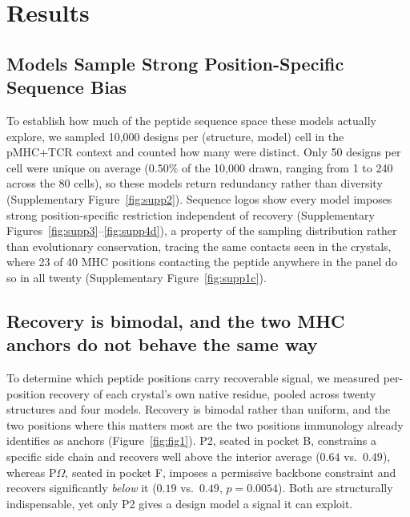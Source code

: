 \documentclass[letterpaper]{article}
\begin{document}
\section{Results}

\subsection{Models Sample Strong Position-Specific Sequence Bias}
\label{sec:sampling}

To establish how much of the peptide sequence space these models actually explore, we sampled 10,000
designs per (structure, model) cell in the pMHC+TCR context and counted how many were distinct. Only 50
designs per cell were unique on average ($0.50\%$ of the 10,000 drawn, ranging from 1 to 240 across the
80 cells), so these models return redundancy rather than diversity (Supplementary
Figure~\ref{fig:supp2}). Sequence logos show every
model imposes strong position-specific restriction independent of recovery (Supplementary
Figures~\ref{fig:supp3}--\ref{fig:supp4d}), a property of the sampling distribution rather than
evolutionary conservation, tracing the same contacts seen in the crystals, where 23 of 40 MHC positions
contacting the peptide anywhere in the panel do so in all twenty (Supplementary
Figure~\ref{fig:supp1c}).

\subsection{Recovery is bimodal, and the two MHC anchors do not behave the same way}
\label{sec:recovery}

To determine which peptide positions carry recoverable signal, we measured per-position recovery of each
crystal's own native residue, pooled across twenty structures and four models. Recovery is bimodal rather
than uniform, and the two positions where this matters most are the two positions immunology already
identifies as anchors (Figure~\ref{fig:fig1}). P2, seated in pocket B, constrains a specific side chain
and recovers well above the interior average ($0.64$ vs.\ $0.49$), whereas P$\Omega$, seated in pocket F,
imposes a permissive backbone constraint and recovers significantly \emph{below} it ($0.19$ vs.\ $0.49$,
$p=0.0054$). Both are structurally indispensable, yet only P2 gives a design model a signal it can
exploit.
\end{document}
